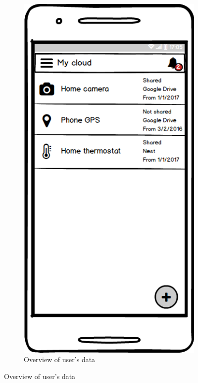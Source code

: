 \documentclass[conference]{IEEEtran}
\begin{document}
\begin{figure}[t]

	\begin{subfigure}{0.24\textwidth}
	\includegraphics[width=0.95\linewidth]{screen1.png}
	\caption{Overview of user's data}
	\label{fig:screen1}
	\end{subfigure}

\end{figure}
\end{document}
